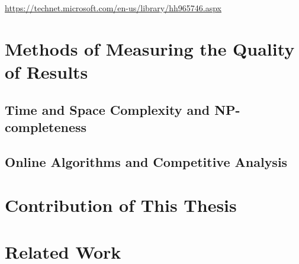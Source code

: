 \url{https://technet.microsoft.com/en-us/library/hh965746.aspx}

\section{Methods of Measuring the Quality of Results}

\subsection{Time and Space Complexity and NP-completeness}
\subsection{Online Algorithms and Competitive Analysis}

\section{Contribution of This Thesis}



\section{Related Work}

